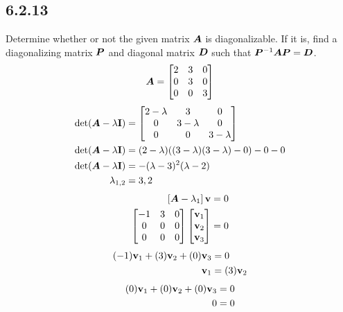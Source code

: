 \documentclass{article}
\begin{document}
\subsection{6.2.13}

Determine whether or not the given matrix $ \bm{A} $ is diagonalizable. If it is, find a diagonalizing matrix $ \bm{P} $ and diagonal matrix $ \bm{D} $ such that $ \bm{P}^{-1}\bm{A}\bm{P} = \bm{D} $.
\begin{equation*}
	\bm{A} =
		\begin{bmatrix}
			2 & 3 & 0 \\
			0 & 3 & 0 \\
			0 & 0 & 3
		\end{bmatrix}
\end{equation*}
\begin{align*}
	\det( \matr{A} - \lambda \vect{I} ) & =
		\begin{bmatrix}
			2 - \lambda & 3 & 0 \\
			0 & 3 - \lambda & 0 \\
			0 & 0 & 3 - \lambda
		\end{bmatrix} \\
	\det( \matr{A} - \lambda \vect{I} ) & =
		(2 - \lambda)( (3 - \lambda)(3 - \lambda) - 0 ) - 0 - 0 \\
	\det( \matr{A} - \lambda \vect{I} ) & =
		-(\lambda - 3)^2(\lambda - 2) \\
	\lambda_{1,2} & = 3, 2
\end{align*}
\begin{align*}
	\left[ \matr{A} - \lambda_1 \right] \vect{v} & = 0 \\
	\begin{bmatrix}
		-1 & 3 & 0 \\
		0 & 0 & 0 \\
		0 & 0 & 0
	\end{bmatrix}
	\begin{bmatrix} \vect{v}_1 \\ \vect{v}_2 \\ \vect{v}_3 \end{bmatrix} & = 0
\end{align*}
\begin{align*}
	(-1)\vect{v}_1 + (3)\vect{v}_2 + (0)\vect{v}_3 & = 0 \\
	\vect{v}_1 & = (3)\vect{v}_2
\end{align*}
\begin{align*}
	(0)\vect{v}_1 + (0)\vect{v}_2 + (0)\vect{v}_3 & = 0 \\
	0 & = 0
\end{align*}
\end{document}
